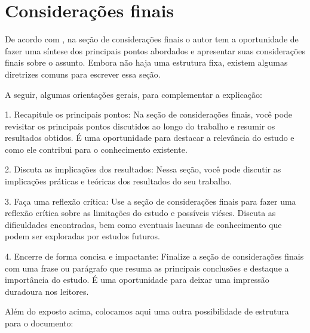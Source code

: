 \documentclass[
	article,			%
	12pt,				%
	oneside,			%
	a4paper,			%
    BIBLATEX,           %
	english,			%
	brazil,				%
	sumario=tradicional
	]{abntex2}
\begin{document}
% 

\section{Considerações finais}


De acordo com , na seção de considerações finais o autor tem a oportunidade de fazer uma síntese dos principais pontos abordados e apresentar suas considerações finais sobre o assunto. Embora não haja uma estrutura fixa, existem algumas diretrizes comuns para escrever essa seção.

A seguir, algumas orientações gerais, para complementar a explicação:

1. Recapitule os principais pontos: Na seção de considerações finais, você pode revisitar os principais pontos discutidos ao longo do trabalho e resumir os resultados obtidos. É uma oportunidade para destacar a relevância do estudo e como ele contribui para o conhecimento existente.

2. Discuta as implicações dos resultados: Nessa seção, você pode discutir as implicações práticas e teóricas dos resultados do seu trabalho. 

3. Faça uma reflexão crítica: Use a seção de considerações finais para fazer uma reflexão crítica sobre as limitações do estudo e possíveis viéses. Discuta as dificuldades encontradas, bem como eventuais lacunas de conhecimento que podem ser exploradas por estudos futuros.

4. Encerre de forma concisa e impactante: Finalize a seção de considerações finais com uma frase ou parágrafo que resuma as principais conclusões e destaque a importância do estudo. É uma oportunidade para deixar uma impressão duradoura nos leitores.

Além do exposto acima, colocamos aqui uma outra possibilidade de estrutura para o documento:
\end{document}
